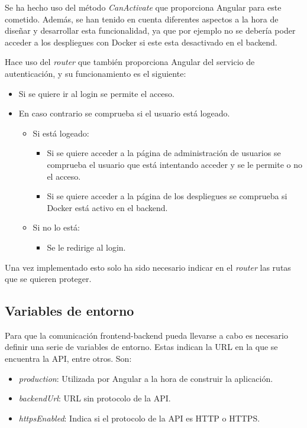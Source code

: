 \bigskip
Se ha hecho uso del método \textit{CanActivate} que proporciona Angular para este cometido. Además, se han tenido en cuenta diferentes aspectos a la hora de diseñar y desarrollar esta funcionalidad, ya que por ejemplo no se debería poder acceder a los despliegues con Docker si este esta desactivado en el backend.

\bigskip
Hace uso del \textit{router} que también proporciona Angular del servicio de autenticación, y su funcionamiento es el siguiente:
\begin{itemize}
	\item Si se quiere ir al login se permite el acceso.
	\item En caso contrario se comprueba si el usuario está logeado.
	\begin{itemize}
		\item Si está logeado:
			\begin{itemize}
				\item Si se quiere acceder a la página de administración de usuarios se comprueba el usuario que está intentando acceder y se le permite o no el acceso.
				\item Si se quiere acceder a la página de los despliegues se comprueba si Docker está activo en el backend.
			\end{itemize}
		\item Si no lo está:
			\begin{itemize}
				\item Se le redirige al login.
			\end{itemize}
	\end{itemize}
\end{itemize}

\bigskip
Una vez implementado esto solo ha sido necesario indicar en el \textit{router} las rutas que se quieren proteger.


\subsection{Variables de entorno}


Para que la comunicación frontend-backend pueda llevarse a cabo es necesario definir una serie de variables de entorno. Estas indican la URL en la que se encuentra la API, entre otros. Son:
\begin{itemize}
	\item \textit{production}: Utilizada por Angular a la hora de construir la aplicación.
	\item \textit{backendUrl}: URL sin protocolo de la API.
	\item \textit{httpsEnabled}: Indica si el protocolo de la API es HTTP o HTTPS.
\end{itemize}

